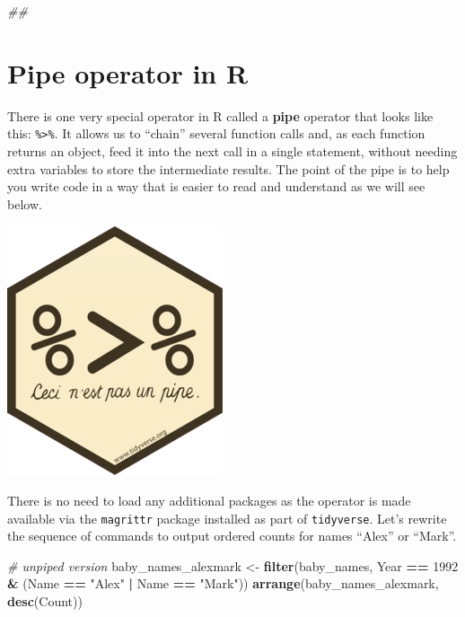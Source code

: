 \documentclass[]{book}
\newenvironment{Shaded}{\begin{snugshade}}{\end{snugshade}}
\newcommand{\CommentTok}[1]{\textcolor[rgb]{0.56,0.35,0.01}{\textit{#1}}}
\newcommand{\DecValTok}[1]{\textcolor[rgb]{0.00,0.00,0.81}{#1}}
\newcommand{\KeywordTok}[1]{\textcolor[rgb]{0.13,0.29,0.53}{\textbf{#1}}}
\newcommand{\NormalTok}[1]{#1}
\newcommand{\OperatorTok}[1]{\textcolor[rgb]{0.81,0.36,0.00}{\textbf{#1}}}
\newcommand{\StringTok}[1]{\textcolor[rgb]{0.31,0.60,0.02}{#1}}
\begin{document}
\begin{Shaded}
\begin{Highlighting}[]
\CommentTok{##}
\end{Highlighting}
\end{Shaded}

\hypertarget{pipe-operator-in-r}{%
\section{Pipe operator in R}\label{pipe-operator-in-r}}

There is one very special operator in R called a \textbf{pipe} operator that
looks like this: \texttt{\%\textgreater{}\%}. It allows us to ``chain'' several function calls and,
as each function returns an object, feed it into the next call in a single
statement, without needing extra variables to store the intermediate
results. The point of the pipe is to help you write code in a way that is
easier to read and understand as we will see below.

\includegraphics{R/Rintro/images/magrittr.png}

There is no need to load any additional packages as the operator is made
available via the \texttt{magrittr} package installed as part of \texttt{tidyverse}. Let's
rewrite the sequence of commands to output ordered counts for names
``Alex'' or ``Mark''.

\begin{Shaded}
\begin{Highlighting}[]
\CommentTok{# unpiped version}
\NormalTok{baby_names_alexmark <-}\StringTok{ }\KeywordTok{filter}\NormalTok{(baby_names, Year }\OperatorTok{==}\StringTok{ }\DecValTok{1992} \OperatorTok{&}\StringTok{ }\NormalTok{(Name }\OperatorTok{==}\StringTok{ "Alex"} \OperatorTok{|}\StringTok{ }\NormalTok{Name }\OperatorTok{==}\StringTok{ "Mark"}\NormalTok{))}
\KeywordTok{arrange}\NormalTok{(baby_names_alexmark, }\KeywordTok{desc}\NormalTok{(Count))}
\end{Highlighting}
\end{Shaded}
\end{document}
